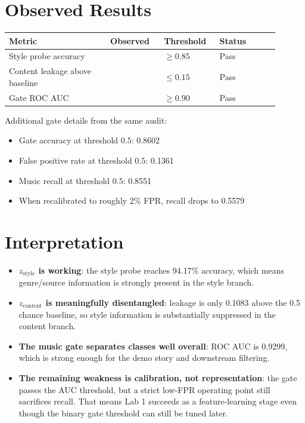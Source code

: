\documentclass[11pt]{article}
\begin{document}
\section*{Observed Results}
\begin{tabular}{>{\raggedright\arraybackslash}p{0.34\linewidth} >{\raggedleft\arraybackslash}p{0.18\linewidth} >{\raggedleft\arraybackslash}p{0.18\linewidth} >{\raggedright\arraybackslash}p{0.20\linewidth}}
\toprule
\textbf{Metric} & \textbf{Observed} & \textbf{Threshold} & \textbf{Status} \\
\midrule
Style probe accuracy & 0.9417 & $\geq 0.85$ & Pass \\
Content leakage above baseline & 0.1083 & $\leq 0.15$ & Pass \\
Gate ROC AUC & 0.9299 & $\geq 0.90$ & Pass \\
\bottomrule
\end{tabular}

\vspace{0.5em}

\noindent Additional gate details from the same audit:
\begin{itemize}
  \item Gate accuracy at threshold $0.5$: 0.8602
  \item False positive rate at threshold $0.5$: 0.1361
  \item Music recall at threshold $0.5$: 0.8551
  \item When recalibrated to roughly 2\% FPR, recall drops to 0.5579
\end{itemize}

\section*{Interpretation}
\begin{itemize}
  \item \textbf{$z_{\text{style}}$ is working}: the style probe reaches 94.17\% accuracy, which means genre/source information is strongly present in the style branch.
  \item \textbf{$z_{\text{content}}$ is meaningfully disentangled}: leakage is only 0.1083 above the 0.5 chance baseline, so style information is substantially suppressed in the content branch.
  \item \textbf{The music gate separates classes well overall}: ROC AUC is 0.9299, which is strong enough for the demo story and downstream filtering.
  \item \textbf{The remaining weakness is calibration, not representation}: the gate passes the AUC threshold, but a strict low-FPR operating point still sacrifices recall. That means Lab 1 succeeds as a feature-learning stage even though the binary gate threshold can still be tuned later.
\end{itemize}
\end{document}
